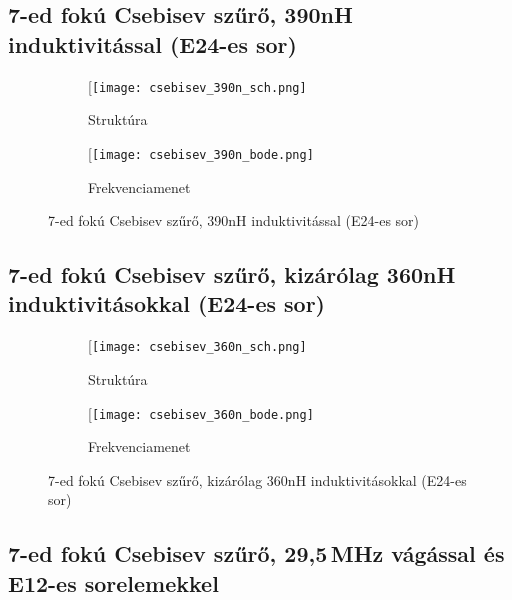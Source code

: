 \subsection*{7-ed fokú Csebisev szűrő, 390nH induktivitással (E24-es sor)}

\begin{figure}[!ht]
	\centering
	\begin{subfigure}[b]{\textwidth}
		\centering
		\centerline{[\texttt{[image: csebisev\_390n\_sch.png]}}
		\label{fig:csebisev_390n_sch}
		\caption{Struktúra}
	\end{subfigure}
	\hfill
	\begin{subfigure}[b]{\textwidth}
		\centering
		\centerline{[\texttt{[image: csebisev\_390n\_bode.png]}}
		\label{fig:csebisev_390n_bode}
		\caption{Frekvenciamenet}
	\end{subfigure}
	\caption{7-ed fokú Csebisev szűrő, 390nH induktivitással (E24-es sor)}
	\label{fig:csebisev_390n}
\end{figure}

\newpage


\subsection*{7-ed fokú Csebisev szűrő, kizárólag 360nH induktivitásokkal (E24-es sor)}

\begin{figure}[!ht]
	\centering
	\begin{subfigure}[b]{\textwidth}
		\centering
		\centerline{[\texttt{[image: csebisev\_360n\_sch.png]}}
		\label{fig:csebisev_360n_sch}
		\caption{Struktúra}
	\end{subfigure}
	\hfill
	\begin{subfigure}[b]{\textwidth}
		\centering
		\centerline{[\texttt{[image: csebisev\_360n\_bode.png]}}
		\label{fig:csebisev_360n_bode}
		\caption{Frekvenciamenet}
	\end{subfigure}
	\caption{7-ed fokú Csebisev szűrő, kizárólag 360nH induktivitásokkal (E24-es sor)}
	\label{fig:csebisev_360n}
\end{figure}

\newpage


\subsection*{7-ed fokú Csebisev szűrő, 29,5\,MHz vágással és E12-es sorelemekkel}

